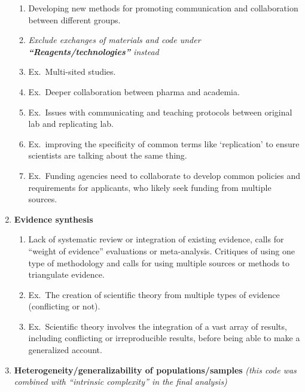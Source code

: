 \documentclass[
]{scrartcl}
\begin{document}
\begin{enumerate}
\begin{enumerate}
  \item
    Developing new methods for promoting communication and collaboration
    between different groups.
  \item
    \emph{Exclude exchanges of materials and code under
    \textbf{``Reagents/technologies''} instead}
  \item
    Ex.~Multi-sited studies.
  \item
    Ex.~Deeper collaboration between pharma and academia.
  \item
    Ex.~Issues with communicating and teaching protocols between
    original lab and replicating lab.
  \item
    Ex.~improving the specificity of common terms like `replication' to
    ensure scientists are talking about the same thing.
  \item
    Ex.~Funding agencies need to collaborate to develop common policies
    and requirements for applicants, who likely seek funding from
    multiple sources.
  \end{enumerate}
\item
  \textbf{Evidence synthesis}

  \begin{enumerate}

  \item
    Lack of systematic review or integration of existing evidence, calls
    for ``weight of evidence'' evaluations or meta-analysis. Critiques
    of using one type of methodology and calls for using multiple
    sources or methods to triangulate evidence.
  \item
    Ex.~The creation of scientific theory from multiple types of
    evidence (conflicting or not).
  \item
    Ex.~Scientific theory involves the integration of a vast array of
    results, including conflicting or irreproducible results, before
    being able to make a generalized account.
  \end{enumerate}
\item
  \textbf{Heterogeneity/generalizability of populations/samples}
  \emph{(this code was combined with ``intrinsic complexity'' in the
  final analysis)}

  \begin{enumerate}


\end{enumerate}
\end{enumerate}
\end{document}
